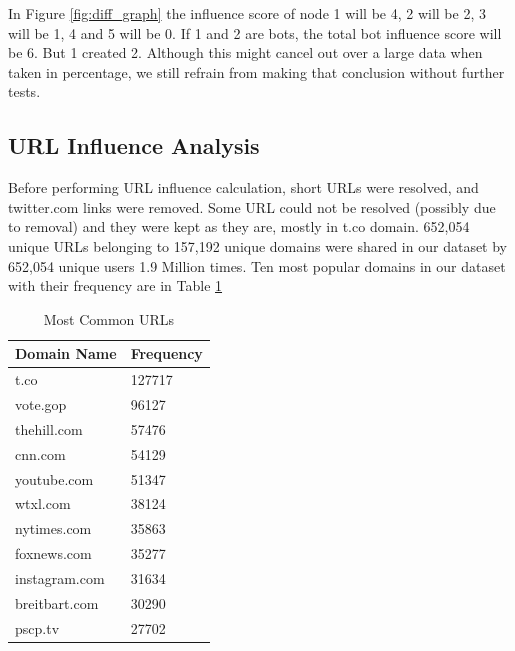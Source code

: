 \documentclass[letterpaper]{article}
\begin{document}
In Figure \ref{fig:diff_graph} the influence score of node 1 will be 4, 2 will be 2, 3 will be 1, 4 and 5 will be 0. If 1 and 2 are bots, the total bot influence score will be 6. But 1 created 
2. Although this might cancel out over a large data when taken in percentage, we still refrain from making that conclusion without further tests. 

\subsection{URL Influence Analysis}
Before performing URL influence calculation, short URLs were resolved, and twitter.com links were removed. Some URL could not be resolved (possibly due to removal) and they were kept as they are, 
mostly in t.co domain. 652,054 unique URLs belonging to 157,192 unique domains were shared in our dataset by 652,054 unique users 1.9 Million times. Ten most popular domains in our dataset with their frequency are
in Table \ref{tab:Common_urls}

\begin{table}
    \centering
    \begin{tabular}{|l|l|}
    \hline
    \textbf{Domain Name} & \textbf{Frequency} \\ \hline
    t.co & 127717 \\ \hline
    vote.gop & 96127 \\ \hline
    thehill.com & 57476 \\ \hline
    cnn.com & 54129 \\ \hline
    youtube.com & 51347 \\ \hline
    wtxl.com & 38124 \\ \hline
    nytimes.com & 35863 \\ \hline
    foxnews.com & 35277 \\ \hline
    instagram.com & 31634 \\ \hline
    breitbart.com & 30290 \\ \hline
    pscp.tv & 27702 \\ \hline
    \end{tabular}
    \caption{Most Common URLs}
    \label{tab:Common_urls}
\end{table}
\end{document}
